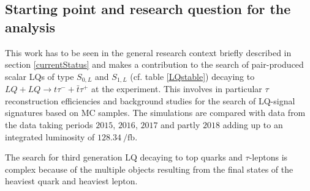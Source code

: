 \subsection{Starting point and research question for the analysis}\label{startingpoint}
This work has to be seen in the general research context briefly described in section \ref{currentStatus} and makes a contribution to the search of pair-produced scalar LQs of type $S_{0,L}$ and $S_{1,L}$ (cf. table \ref{LQstable}) decaying to $LQ+LQ\rightarrow t\tau^{-}+\bar{t}\tau^{+}$ at the {\ATLAS} experiment. This involves in particular $\tau$ reconstruction efficiencies and background studies for the search of LQ-signal signatures based on MC samples. The simulations are compared with data from the data taking periods $2015$, $2016$, $2017$ and partly $2018$ adding up to an integrated luminosity of $\SI{128.34}{\per\femto\barn}$.\par   
The search for third generation LQ decaying to top quarks and $\tau$-leptons is complex because of the multiple objects resulting from the final states of the heaviest quark and heaviest lepton. 
%
